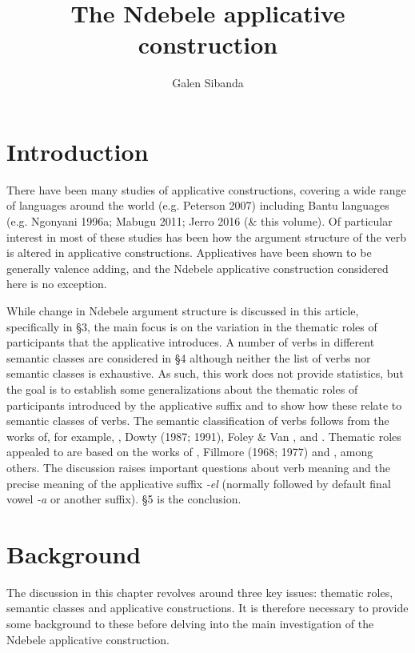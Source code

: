 \documentclass[output=paper]{langsci/langscibook}
\title{The Ndebele applicative construction}
\author{%
 Galen Sibanda \affiliation{Michigan State University} 
}
\begin{document}
 


\section {Introduction}

There have been many studies of applicative constructions, covering a wide range of languages around the world (e.g. Peterson 2007) including Bantu languages (e.g. Ngonyani 1996a; Mabugu 2011; Jerro 2016 (\& this volume). Of particular interest in most of these studies has been how the argument structure of the verb is altered in applicative constructions. Applicatives have been shown to be generally valence adding, and the Ndebele applicative construction considered here is no exception. 

 While change in Ndebele argument structure is discussed in this article, specifically in §3, the main focus is on the variation in the thematic roles of participants that the applicative introduces. A number of verbs in different semantic classes are considered in §4 although neither the list of verbs nor semantic classes is exhaustive. As such, this work does not provide statistics, but the goal is to establish some generalizations about the thematic roles of participants introduced by the applicative suffix and to show how these relate to semantic classes of verbs. The semantic classification of verbs follows from the works of, for example, \citet{Chafe1970}, Dowty (1987; 1991), Foley \& Van \citet{Valin1984}, and \citet{Payne1997}. Thematic roles appealed to are based on the works of \citet{Frawley1992}, Fillmore (1968; 1977) and \citet{Halliday1970}, among others. The discussion raises important questions about verb meaning and the precise meaning of the applicative suffix \textit{-el }(normally followed by default final vowel \textit{-a} or another suffix). §5 is the conclusion.

\section {Background}

The discussion in this chapter revolves around three key issues: thematic roles, semantic classes and applicative constructions. It is therefore necessary to provide some background to these before delving into the main investigation of the Ndebele applicative construction. 
\end{document}
